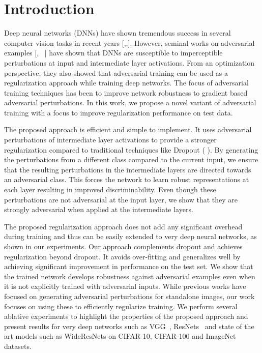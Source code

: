 \documentclass[letterpaper]{article} %
\begin{document}
\section{Introduction}\label{sec:intro}
Deep neural networks (DNNs) have shown tremendous success in several computer vision tasks in recent years [\cite{resnet},\cite{schroff2015facenet},\cite{krizhevsky2012imagenet}]. However, seminal works on adversarial examples [\cite{goodfellow2014explaining}, ~\cite{szegedy2013intriguing}] have shown that DNNs are susceptible to imperceptible perturbations at input and intermediate layer activations. From an optimization perspective, they also showed that adversarial training can be used as a regularization approach while training deep networks.  The focus of adversarial training techniques has been to improve network robustness to gradient based adversarial perturbations. In this work, we propose a novel variant of adversarial training with a focus to improve regularization performance on test data.

The proposed approach is efficient and simple to implement. It uses adversarial perturbations of intermediate layer activations to provide a stronger regularization compared to traditional techniques like Dropout (\citeauthor{srivastava2014dropout} \citeyear{srivastava2014dropout}). By generating the perturbations from a different class compared to the current input, we ensure that the resulting perturbations in the intermediate layers are directed towards an adversarial class. This forces the network to learn robust representations at each layer resulting in improved discriminability. Even though these perturbations are not adversarial at the input layer, we show that they are strongly adversarial when applied at the intermediate layers. 

The proposed regularization approach does not add any significant overhead during training and thus can be easily extended to very deep neural networks, as shown in our experiments. Our approach complements dropout and achieves regularization beyond dropout. It avoids over-fitting and generalizes well by achieving significant improvement in performance on the test set. We show that the trained network develops robustness against adversarial examples even when it is not explicitly trained with adversarial inputs. While previous works have focused on generating adversarial perturbations for standalone images, our work focuses on using these to efficiently regularize training. We perform several ablative experiments to highlight the properties of the proposed approach and present results for very deep networks such as VGG~\cite{vgg}, ResNets~\cite{resnet} and state of the art models such as WideResNets \cite{wideresnet} on CIFAR-10, CIFAR-100 and ImageNet datasets.
\end{document}
